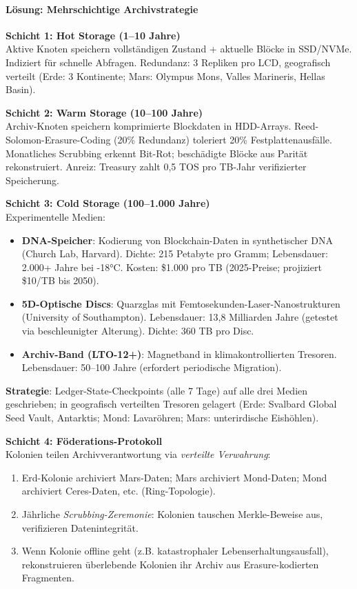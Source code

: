 \documentclass[11pt]{article}
\begin{document}
\paragraph{Lösung: Mehrschichtige Archivstrategie}

\textbf{Schicht 1: Hot Storage (1--10 Jahre)}\\
Aktive Knoten speichern vollständigen Zustand + aktuelle Blöcke in SSD/NVMe. Indiziert für schnelle Abfragen. Redundanz: 3 Repliken pro LCD, geografisch verteilt (Erde: 3 Kontinente; Mars: Olympus Mons, Valles Marineris, Hellas Basin).

\textbf{Schicht 2: Warm Storage (10--100 Jahre)}\\
Archiv-Knoten speichern komprimierte Blockdaten in HDD-Arrays. Reed-Solomon-Erasure-Coding (20\% Redundanz) toleriert 20\% Festplattenausfälle. Monatliches Scrubbing erkennt Bit-Rot; beschädigte Blöcke aus Parität rekonstruiert. Anreiz: Treasury zahlt 0,5 TOS pro TB-Jahr verifizierter Speicherung.

\textbf{Schicht 3: Cold Storage (100--1.000 Jahre)}\\
Experimentelle Medien:
\begin{itemize}[noitemsep]
  \item \textbf{DNA-Speicher}: Kodierung von Blockchain-Daten in synthetischer DNA (Church Lab, Harvard). Dichte: 215 Petabyte pro Gramm; Lebensdauer: 2.000+ Jahre bei -18°C. Kosten: \$1.000 pro TB (2025-Preise; projiziert \$10/TB bis 2050).
  \item \textbf{5D-Optische Discs}: Quarzglas mit Femtosekunden-Laser-Nanostrukturen (University of Southampton). Lebensdauer: 13,8 Milliarden Jahre (getestet via beschleunigter Alterung). Dichte: 360 TB pro Disc.
  \item \textbf{Archiv-Band (LTO-12+)}: Magnetband in klimakontrollierten Tresoren. Lebensdauer: 50--100 Jahre (erfordert periodische Migration).
\end{itemize}
\textbf{Strategie}: Ledger-State-Checkpoints (alle 7 Tage) auf alle drei Medien geschrieben; in geografisch verteilten Tresoren gelagert (Erde: Svalbard Global Seed Vault, Antarktis; Mond: Lavaröhren; Mars: unterirdische Eishöhlen).

\textbf{Schicht 4: Föderations-Protokoll}\\
Kolonien teilen Archivverantwortung via \emph{verteilte Verwahrung}:
\begin{enumerate}[noitemsep]
  \item Erd-Kolonie archiviert Mars-Daten; Mars archiviert Mond-Daten; Mond archiviert Ceres-Daten, etc. (Ring-Topologie).
  \item Jährliche \emph{Scrubbing-Zeremonie}: Kolonien tauschen Merkle-Beweise aus, verifizieren Datenintegrität.
  \item Wenn Kolonie offline geht (z.B. katastrophaler Lebenserhaltungsausfall), rekonstruieren überlebende Kolonien ihr Archiv aus Erasure-kodierten Fragmenten.
\end{enumerate}
\end{document}
